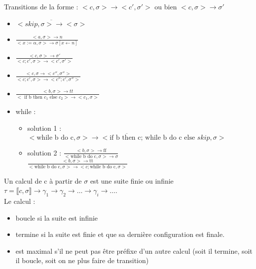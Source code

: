 \documentclass[10pt,a4paper]{article}
\newcommand{\semm}[1]{\llbracket #1 \rrbracket }
\begin{document}
\noindent Transitions de la forme : $<c, \sigma> \rightarrow <c', \sigma'>$ ou bien $<c, \sigma> \rightarrow \sigma'$\\
\begin{itemize}


\item $\displaystyle \overline{ <skip, \sigma > \rightarrow <\sigma> }$\\
\item $\displaystyle\frac{<a, \sigma > \rightarrow n }{ < x := \alpha , \sigma > \rightarrow \sigma [x \leftarrow n ] }$\\
\item $\displaystyle \frac{ <c, \sigma > \rightarrow \sigma' }{  < c; c' , \sigma > \rightarrow <c', \sigma'> }$\\
\item $\displaystyle \frac{< c, \sigma \rightarrow <c'', \sigma''>}{ <c; c', \sigma > \rightarrow <c''; c', \sigma'' > }$\\
\item $\displaystyle \frac{ <b, \sigma> \rightarrow tt }{<\text{ if b then }  c_1\text{ else }c_2> \rightarrow <c_1, \sigma > }$\\
\item while : \begin{itemize}


 \item solution 1 : $\displaystyle \overline{ < \text{while b do c}, \sigma > \rightarrow < \text{if b then c; while b do c else }skip, \sigma > }$\\
 
\item solution 2 : $\displaystyle \frac{ < b, \sigma > \rightarrow \text{ff}}{ < \text{while b do c}, \sigma > \rightarrow \sigma }$\\

$\displaystyle  \frac{ < b, \sigma > \rightarrow \text{tt}}{ < \text{while b do c}, \sigma > \rightarrow <c;\text{while b do c}, \sigma >}$\\
\end{itemize}
\end{itemize}

\begin{definition}[Calcul] Un calcul de c à partir de $\sigma$ est une suite finie ou infinie 
$\tau = \semm{c, \sigma} \rightarrow \gamma_1 \rightarrow \gamma_2 \rightarrow \dotsc \rightarrow \gamma_i \rightarrow \dotsc$.\\
Le calcul :\begin{itemize}
\item boucle si la suite est infinie
\item termine si la suite est finie et que sa dernière configuration est finale.
\item est maximal s'il ne peut pas \^etre préfixe d'un autre calcul (soit il termine, soit il boucle, soit on ne plus faire de transition)
\end{itemize}
\end{definition}
\end{document}
